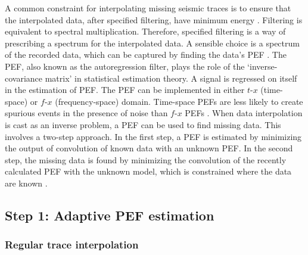 A common constraint for interpolating missing seismic traces is to
ensure that the interpolated data, after specified filtering, have
minimum energy \cite[]{Claerbout92}. Filtering is equivalent to
spectral multiplication. Therefore, specified filtering is a way of
prescribing a spectrum for the interpolated data. A sensible choice is
a spectrum of the recorded data, which can be captured by finding the
data's PEF \cite[]{GEO56-06-07850794,Crawley00}. The PEF, also known
as the autoregression filter, plays the role of the
`inverse-covariance matrix' in statistical estimation theory. A signal
is regressed on itself in the estimation of PEF. The PEF can be
implemented in either $t$-$x$ (time-space) or $f$-$x$
(frequency-space) domain.  Time-space PEFs are less likely to create
spurious events in the presence of noise than $f$-$x$ PEFs
\cite[]{Abma95,Crawley00}. When data interpolation is cast as an
inverse problem, a PEF can be used to find missing data. This involves
a two-step approach. In the first step, a PEF is
estimated by minimizing the output of convolution of known
data with an unknown PEF. In the second step, the
missing data is found by minimizing the convolution of the recently
calculated PEF with the unknown model, which is constrained where the
data are known \cite[]{Curry04}.

\subsection{Step 1: Adaptive PEF estimation}
 \subsubsection{Regular trace interpolation} 

